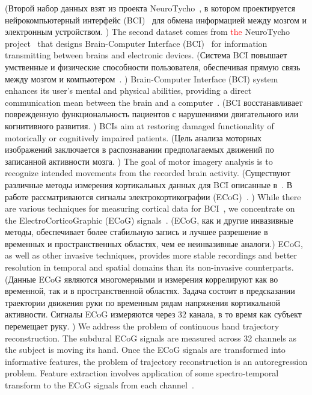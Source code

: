 \documentclass[12pt,twoside]{article}
\begin{document}
(Второй набор данных взят из проекта NeuroTycho~\cite{neurotycho}, в котором проектируется нейрокомпьютерный интерфейс (BCI)~\cite{millan2010combining,mason2007comprehensive} для обмена информацией между мозгом и электронным устройством. )
The second dataset comes from \textcolor{red}{the} NeuroTycho project~\cite{neurotycho} that designs Brain-Computer Interface (BCI)~\cite{millan2010combining,mason2007comprehensive} for information transmitting between brains and electronic devices.
(Система BCI повышает умственные и физические способности пользователя, обеспечивая прямую связь между мозгом и компьютером~\cite{millan2004brain}. )
Brain-Computer Interface (BCI) system enhances its user’s mental and physical abilities, providing a direct communication mean between the brain and a computer~\cite{millan2004brain}. 
(BCI восстанавливает поврежденную функциональность пациентов с нарушениями двигательного или когнитивного развития. )
BCIs aim at restoring damaged functionality of motorically or cognitively impaired patients.
(Цель анализа моторных изображений заключается в распознавании предполагаемых движений по записанной активности мозга. )
The goal of motor imagery analysis is to recognize intended movements from the recorded brain activity. 
(Существуют различные методы измерения кортикальных данных для BCI описанные в~\cite{nicolas2012brain,amiri2013review}. 
В работе рассматриваются сигналы электрокортикографии (ECoG)~\cite{eliseyev2016penalized}. )
While there are various techniques for measuring cortical data for BCI~\cite{nicolas2012brain,amiri2013review}, we concentrate on the ElectroCorticoGraphic (ECoG) signals~\cite{eliseyev2016penalized}. 
(ECoG, как и другие инвазивные методы, обеспечивает более стабильную запись и лучшее разрешение в временных и пространственных областях, чем ее неинвазивные аналоги.)
ECoG, as well as other invasive techniques, provides more stable recordings and better resolution in temporal and spatial domains than its non-invasive counterparts.
(Данные ECoG являются многомерными и измерения коррелируют как во временной, так и в пространственной областях.
Задача состоит в предсказании траектории движения руки по временным рядам напряжения кортикальной активности. 
Сигналы ECoG измеряются через 32 канала, в то время как субъект перемещает руку. )
We address the problem of continuous hand trajectory reconstruction. 
The subdural ECoG signals are measured across 32 channels as the subject is moving its hand.
Once the ECoG signals are transformed into informative features, the problem of trajectory reconstruction is an autoregression problem. 
Feature extraction involves application of some spectro-temporal transform to the ECoG signals from each channel~\cite{gasanov2017pls}.
\end{document}
